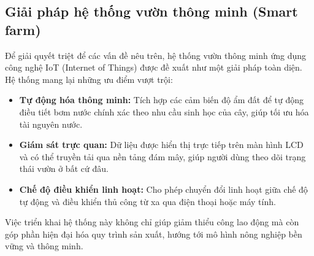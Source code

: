 \subsection{Giải pháp hệ thống vườn thông minh (Smart farm)}
Để giải quyết triệt để các vấn đề nêu trên, hệ thống vườn thông minh ứng dụng công nghệ IoT (Internet of Things) được đề xuất như một giải pháp toàn diện. Hệ thống mang lại những ưu điểm vượt trội:
\begin{itemize}
    \item \textbf{Tự động hóa thông minh:} Tích hợp các cảm biến độ ẩm đất để tự động điều tiết bơm nước chính xác theo nhu cầu sinh học của cây, giúp tối ưu hóa tài nguyên nước.
    \item \textbf{Giám sát trực quan:} Dữ liệu được hiển thị trực tiếp trên màn hình LCD và có thể truyền tải qua nền tảng đám mây, giúp người dùng theo dõi trạng thái vườn ở bất cứ đâu.
    \item \textbf{Chế độ điều khiển linh hoạt:} Cho phép chuyển đổi linh hoạt giữa chế độ tự động và điều khiển thủ công từ xa qua điện thoại hoặc máy tính.
\end{itemize}
Việc triển khai hệ thống này không chỉ giúp giảm thiểu công lao động mà còn góp phần hiện đại hóa quy trình sản xuất, hướng tới mô hình nông nghiệp bền vững và thông minh.